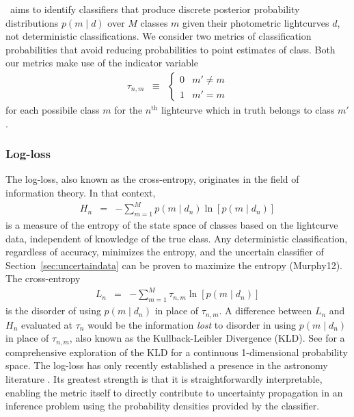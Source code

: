 \plasticc\ aims to identify classifiers that produce discrete posterior probability distributions $p(m \mid d)$ over $M$ classes $m$ given their photometric lightcurves $d$, not deterministic classifications.
We consider two metrics of classification probabilities that avoid reducing probabilities to point estimates of class.
Both our metrics make use of the indicator variable
\begin{eqnarray}
  \label{eq:indicator}
  \tau_{n, m} &\equiv& \begin{cases}
  0 & m' \neq m\\
  1 & m' = m
  \end{cases}
\end{eqnarray}
for each possibile class $m$ for the $n^{\mathrm{th}}$ lightcurve which in truth belongs to class $m'$.

\subsubsection{Log-loss}
\label{sec:logloss}

The log-loss, also known as the cross-entropy, originates in the field of information theory.
In that context,
\begin{eqnarray}
  \label{eq:entropy}
  H_{n} &=& -\sum_{m=1}^{M}p(m \mid d_{n})\ln[p(m \mid d_{n})]
\end{eqnarray}
is a measure of the entropy of the state space of classes based on the lightcurve data, independent of knowledge of the true class.
Any deterministic classification, regardless of accuracy, minimizes the entropy, and the uncertain classifier of Section~\ref{sec:uncertaindata} can be proven to maximize the entropy (Murphy12).
The cross-entropy
\begin{eqnarray}
  \label{eq:logloss}
  L_{n} &=& -\sum_{m=1}^{M}\tau_{n, m}\ln[p(m \mid d_{n})]
\end{eqnarray}
is the disorder of using $p(m \mid d_{n})$ in place of $\tau_{n, m}$.
A difference between $L_{n}$ and $H_{n}$ evaluated at $\tau_{n}$ would be the information \textit{lost} to disorder in using $p(m \mid d_{n})$ in place of $\tau_{n, m}$, also known as the Kullback-Leibler Divergence (KLD).
See \cite{2018AJ....156...35M} for a comprehensive exploration of the KLD for a continuous 1-dimensional probability space.
The log-loss has only recently established a presence in the astronomy literature \citep{hon_deep_2017, hon_deep_2018}.
Its greatest strength is that it is straightforwardly interpretable, enabling the metric itself to directly contribute to uncertainty propagation in an inference problem using the probability densities provided by the classifier.


